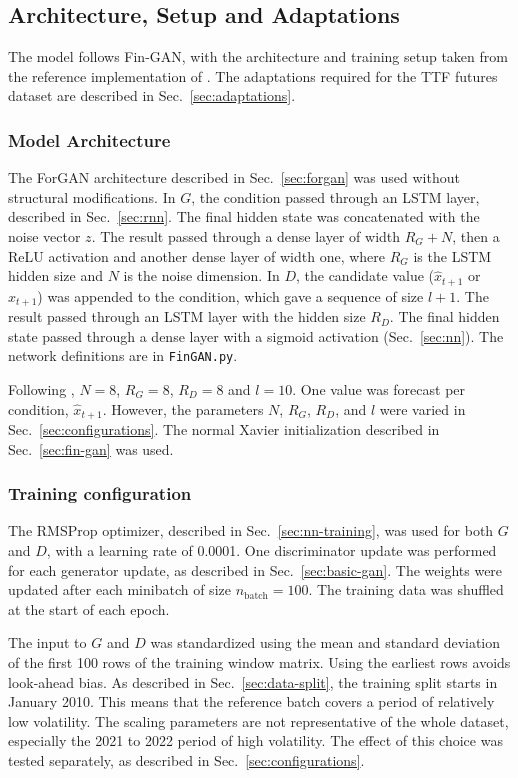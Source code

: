 \subsection{Architecture, Setup and Adaptations}\label{sec:model}
The model follows Fin-GAN, with the architecture and training setup taken from the reference implementation of
\textcite{vuleticFinGANForecastingClassifying2024}. The adaptations required for the TTF futures dataset are described in
Sec.~\ref{sec:adaptations}.

\subsubsection{Model Architecture}
The ForGAN architecture described in Sec.~\ref{sec:forgan} was used without structural modifications. In $G$, the condition passed through an LSTM layer, described in Sec.~\ref{sec:rnn}. The final hidden state was concatenated with the noise vector $z$. The result passed through a dense layer of width $R_G+N$, then a ReLU activation and another dense layer of width one, where $R_G$ is the LSTM hidden size and $N$ is the noise dimension.
In $D$, the candidate value ($\hat{x}_{t+1}$ or $x_{t+1}$) was appended to the condition, which gave a sequence of size $l+1$. The result passed through an LSTM layer with the hidden size $R_D$. The final hidden state passed through a dense layer with a sigmoid activation (Sec.~\ref{sec:nn}). The network definitions are in \texttt{FinGAN.py}.


Following \textcite{vuleticFinGANForecastingClassifying2024}, $N=8$, $R_G=8$, $R_D=8$ and $l=10$. One value was forecast per condition,
$\hat{x}_{t+1}$. However, the parameters $N$, $R_G$, $R_D$, and $l$ were varied in Sec.~\ref{sec:configurations}. The normal Xavier initialization described in Sec.~\ref{sec:fin-gan} was used.

\subsubsection{Training configuration}\label{sec:training-config}
The RMSProp optimizer, described in Sec.~\ref{sec:nn-training}, was used for both $G$ and $D$, with a learning rate of 0.0001. One discriminator update was performed for each generator update, as described in Sec.~\ref{sec:basic-gan}. The weights were updated after each minibatch of size $n_{\text{batch}}=100$. The training data was shuffled at the start of each epoch.

The input to $G$ and $D$ was standardized using the mean and standard deviation of the first 100 rows of the training window matrix. Using the earliest rows avoids look-ahead bias. As described in Sec.~\ref{sec:data-split}, the training split starts in January 2010. This means that the reference batch covers a period of relatively low volatility. The scaling parameters are not representative of the whole dataset, especially the 2021 to 2022 period of high volatility. The effect of this choice was tested separately, as described in Sec.~\ref{sec:configurations}.

